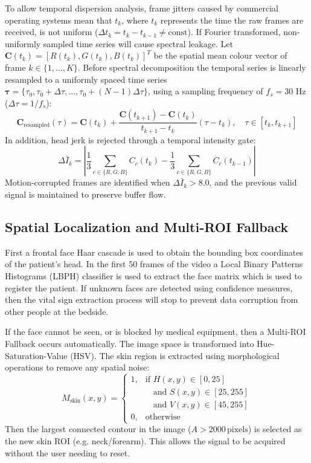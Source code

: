 \documentclass[conference]{IEEEtran}
\begin{document}
To allow temporal dispersion analysis, frame jitters caused by commercial operating systems mean that $t_k$, where $t_k$ represents the time the raw frames are received, is not uniform ($\Delta t_k = t_k - t_{k-1} \neq \text{const}$). If Fourier transformed, non-uniformly sampled time series will cause spectral leakage. Let $\mathbf{C}(t_k) = [R(t_k), G(t_k), B(t_k)]^T$ be the spatial mean colour vector of frame $k \in \{1, \dots, K\}$. Before spectral decomposition the temporal series is linearly resampled to a uniformly spaced time series $\mathbf{\tau} = \{\tau_0, \tau_0 + \Delta\tau, \dots, \tau_0 + (N-1)\Delta\tau\}$, using a sampling frequency of $f_s = 30\text{ Hz}$ ($\Delta\tau = 1/f_s$):
\begin{equation}
    \mathbf{C}_{\text{resampled}}(\tau) = \mathbf{C}(t_k) + \frac{\mathbf{C}(t_{k+1}) - \mathbf{C}(t_k)}{t_{k+1} - t_k}(\tau - t_k), \quad \tau \in [t_k, t_{k+1}]
\end{equation}
In addition, head jerk is rejected through a temporal intensity gate:
\begin{equation}
    \Delta \bar{I}_k = \left| \frac{1}{3} \sum_{c \in \{R,G,B\}} C_c(t_k) - \frac{1}{3} \sum_{c \in \{R,G,B\}} C_c(t_{k-1}) \right|
\end{equation}
Motion-corrupted frames are identified when $\Delta \bar{I}_k > 8.0$, and the previous valid signal is maintained to preserve buffer flow.

\subsection{Spatial Localization and Multi-ROI Fallback}
First a frontal face Haar cascade is used to obtain the bounding box coordinates of the patient’s head. In the first 50 frames of the video a Local Binary Patterns Histograms (LBPH) classifier is used to extract the face matrix which is used to register the patient. If unknown faces are detected using confidence measures, then the vital sign extraction process will stop to prevent data corruption from other people at the bedside.

If the face cannot be seen, or is blocked by medical equipment, then a Multi-ROI Fallback occurs automatically. The image space is transformed into Hue-Saturation-Value (HSV). The skin region is extracted using morphological operations to remove any spatial noise:
\begin{equation}
    M_{\mathrm{skin}}(x,y) = 
    \begin{cases} 
      1, & \text{if } H(x,y) \in [0, 25] \\
         & \phantom{\text{if }} \text{and } S(x,y) \in [25, 255] \\
         & \phantom{\text{if }} \text{and } V(x,y) \in [45, 255] \\
      0, & \text{otherwise}
    \end{cases}
\end{equation}
Then the largest connected contour in the image ($A > 2000\,\text{pixels}$) is selected as the new skin ROI (e.g. neck/forearm). This allows the signal to be acquired without the user needing to reset.
\end{document}
